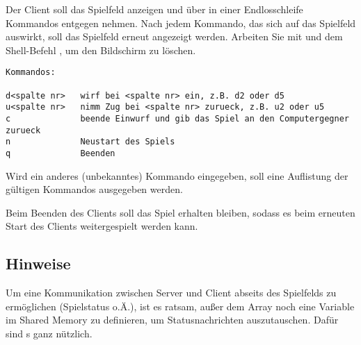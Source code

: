 Der Client soll das Spielfeld anzeigen und über  in einer
Endlosschleife Kommandos entgegen nehmen. Nach jedem Kommando, das sich auf das
Spielfeld auswirkt, soll das Spielfeld erneut angezeigt werden. Arbeiten Sie mit
 und dem Shell-Befehl , um den Bildschirm zu
löschen.

\begin{verbatim}
Kommandos:

d<spalte nr>   wirf bei <spalte nr> ein, z.B. d2 oder d5
u<spalte nr>   nimm Zug bei <spalte nr> zurueck, z.B. u2 oder u5
c              beende Einwurf und gib das Spiel an den Computergegner zurueck
n              Neustart des Spiels
q              Beenden
\end{verbatim}

Wird ein anderes (unbekanntes) Kommando eingegeben, soll eine Auflistung der
gültigen Kommandos ausgegeben werden.

Beim Beenden des Clients soll das Spiel erhalten bleiben, sodass es beim
erneuten Start des Clients weitergespielt werden kann.

\subsection*{Hinweise}
Um eine Kommunikation zwischen Server und Client abseits des Spielfelds zu
ermöglichen (Spielstatus o.Ä.), ist es ratsam, außer dem Array noch eine Variable im Shared
Memory zu definieren, um Statusnachrichten auszutauschen. Dafür sind
s ganz nützlich.

\osueguidelinesthree


